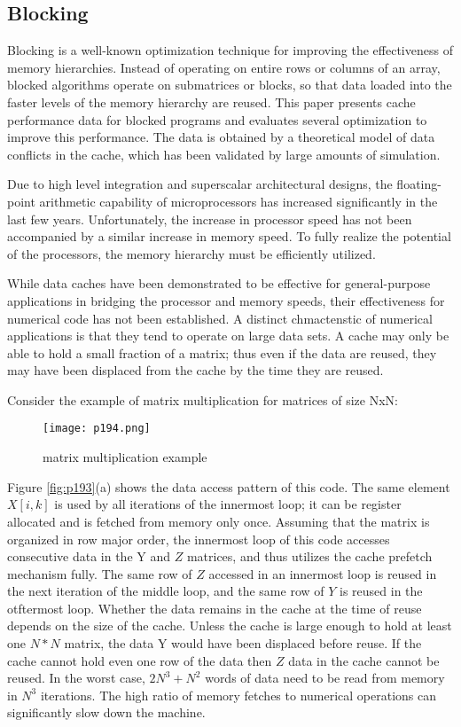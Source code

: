 \subsection{Blocking\cite{lam1991cache}}


Blocking is a well-known optimization technique for improving
the effectiveness of memory hierarchies. Instead of operating on
entire rows or columns of an array, blocked algorithms operate on
submatrices or blocks, so that data loaded into the faster levels
of the memory hierarchy are reused. This paper presents cache
performance data for blocked programs and evaluates several optimization 
to improve this performance. The data is obtained by
a theoretical model of data conflicts in the cache, which has been
validated by large amounts of simulation.

Due to high level integration and superscalar architectural designs,
the floating-point arithmetic capability of microprocessors has increased significantly in the last few years. Unfortunately, the increase in processor speed has not been accompanied by a similar
increase in memory speed. To fully realize the potential of the
processors, the memory hierarchy must be efficiently utilized.

While data caches have been demonstrated to be effective for
general-purpose applications in bridging the processor and memory speeds, their effectiveness for numerical code has not been
established. A distinct chmactenstic of numerical applications is
that they tend to operate on large data sets. A cache may only be
able to hold a small fraction of a matrix; thus even if the data are
reused, they may have been displaced from the cache by the time
they are reused.

Consider the example of matrix multiplication for matrices of size
NxN:

\begin{figure}[H]
	\centering
	\texttt{[image: p194.png]}
	\caption{matrix multiplication example}
	\label{fig:p194}
\end{figure}



Figure \ref{fig:p193}(a) shows the data access pattern of this code. The same
element $X[i,k]$ is used by all iterations of the innermost loop; it
can be register allocated and is fetched from memory only once.
Assuming that the matrix is organized in row major order, the
innermost loop of this code accesses consecutive data in the Y
and $Z$ matrices, and thus utilizes the cache prefetch mechanism
fully. The same row of $Z$ accessed in an innermost loop is reused
in the next iteration of the middle loop, and the same row of
$Y$ is reused in the otftermost loop. Whether the data remains in
the cache at the time of reuse depends on the size of the cache.
Unless the cache is large enough to hold at least one $N * N$
matrix, the data Y would have been displaced before reuse. If
the cache cannot hold even one row of the data then $Z$ data in
the cache cannot be reused. In the worst case, $2N^3 + N^2$ words
of data need to be read from memory in $N^3$ iterations. The high
ratio of memory fetches to numerical operations can significantly
slow down the machine.


